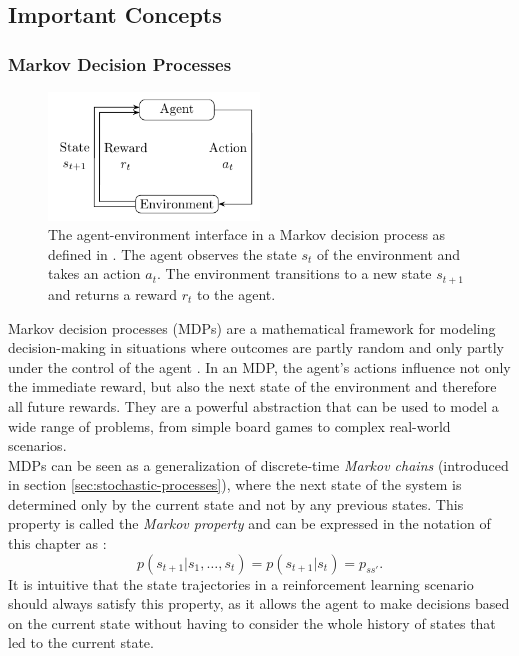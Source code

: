 \subsection{Important Concepts}

\subsubsection{Markov Decision Processes}
\label{subsubsec:mdp}
\begin{figure}[h]
    \centering
    \includegraphics[width=0.5\textwidth]{agent_env_interface.pdf}
    \caption{The agent-environment interface in a Markov decision process as defined in \cite[chapter 3.1]{sutton_reinforcement_nodate}. The agent observes the state $s_t$ of the environment and takes an action $a_t$. The environment transitions to a new state $s_{t+1}$ and returns a reward $r_{t}$ to the agent.}
    \label{fig:agent-env-interface}
\end{figure}
Markov decision processes (MDPs) are a mathematical framework for modeling decision-making in situations where outcomes are partly random and only partly under the control of the agent \cite[chapter 3]{sutton_reinforcement_nodate}.
In an MDP, the agent's actions influence not only the immediate reward, but also the next state of the environment and therefore all future rewards.
They are a powerful abstraction that can be used to model a wide range of problems, from simple board games to complex real-world scenarios.
\\
MDPs can be seen as a generalization of discrete-time \textit{Markov chains} (introduced in section \ref{sec:stochastic-processes}), where the next state of the system is determined only by the current state and not by any previous states.
This property is called the \textit{Markov property} and can be expressed in the notation of this chapter as \cite{serfozo_markov_2009}:
\begin{equation}
    p(s_{t+1} | s_1, \dots, s_t) = p(s_{t+1} | s_t) = p_{ss'} \text{.}
    \label{eq:markov-property}
\end{equation}
It is intuitive that the state trajectories in a reinforcement learning scenario should always satisfy this property, as it allows the agent to make decisions based on the current state without having to consider the whole history of states that led to the current state.
